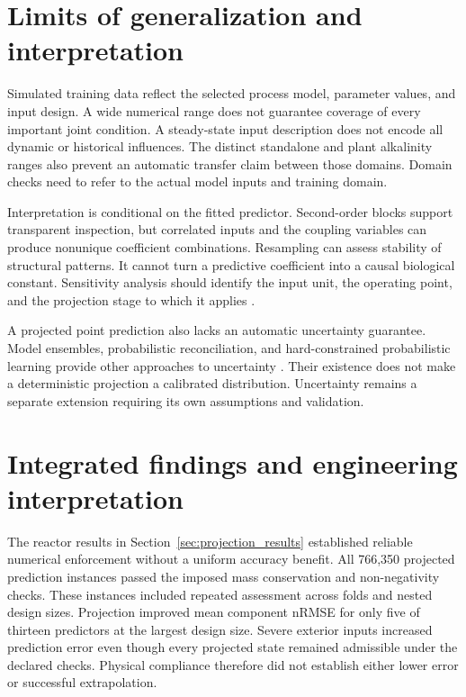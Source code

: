 \section{Limits of generalization and interpretation}

Simulated training data reflect the selected process model, parameter values, and input design. A wide numerical range does not guarantee coverage of every important joint condition. A steady-state input description does not encode all dynamic or historical influences. The distinct standalone and plant alkalinity ranges also prevent an automatic transfer claim between those domains. Domain checks need to refer to the actual model inputs and training domain.

Interpretation is conditional on the fitted predictor. Second-order blocks support transparent inspection, but correlated inputs and the coupling variables can produce nonunique coefficient combinations. Resampling can assess stability of structural patterns. It cannot turn a predictive coefficient into a causal biological constant. Sensitivity analysis should identify the input unit, the operating point, and the projection stage to which it applies \citep{Machado2014,Brunton2016}.

A projected point prediction also lacks an automatic uncertainty guarantee. Model ensembles, probabilistic reconciliation, and hard-constrained probabilistic learning provide other approaches to uncertainty \citep{Lakshminarayanan2017,Hansen2024,Utkarsh2025}. Their existence does not make a deterministic projection a calibrated distribution. Uncertainty remains a separate extension requiring its own assumptions and validation.

\section{Integrated findings and engineering interpretation}
\label{sec:assessment_observed_findings}

The reactor results in Section~\ref{sec:projection_results} established reliable numerical enforcement without a uniform accuracy benefit. All 766,350 projected prediction instances passed the imposed mass conservation and non-negativity checks. These instances included repeated assessment across folds and nested design sizes. Projection improved mean component nRMSE for only five of thirteen predictors at the largest design size. Severe exterior inputs increased prediction error even though every projected state remained admissible under the declared checks. Physical compliance therefore did not establish either lower error or successful extrapolation.

